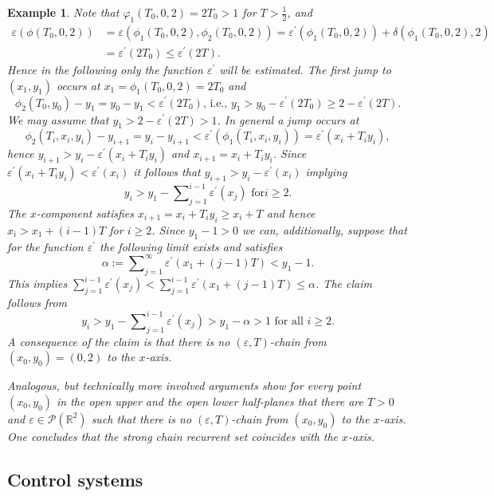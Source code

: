 \documentclass[preprint,12pt]{elsarticle}
\newtheorem{example}{Example}
\begin{document}
\begin{example}
Note that $\varphi_{1}(T_{0},0,2)=2T_{0}>1$ for $T>\frac{1}{2}$, and%
\begin{align*}
\varepsilon(\phi(T_{0},0,2))  &  =\varepsilon(\phi_{1}(T_{0},0,2),\phi
_{2}(T_{0},0,2))=\varepsilon^{\prime}(\phi_{1}(T_{0},0,2))+\delta(\phi
_{1}(T_{0},0,2),2)\\
&  =\varepsilon^{\prime}(2T_{0})\leq\varepsilon^{\prime}(2T).
\end{align*}
Hence in the following only the function $\varepsilon^{\prime}$ will be
estimated. The first jump to $(x_{1},y_{1})$ occurs at $x_{1}=\phi_{1}%
(T_{0},0,2)=2T_{0}$ and%
\[
\phi_{2}(T_{0},y_{0})-y_{1}=y_{0}-y_{1}<\varepsilon^{\prime}(2T_{0})\text{,
i.e., }y_{1}>y_{0}-\varepsilon^{\prime}(2T_{0})\geq2-\varepsilon^{\prime
}(2T).
\]
We may assume that $y_{1}>2-\varepsilon^{\prime}(2T)>1$. In general a jump
occurs at%
\[
\phi_{2}(T_{i},x_{i},y_{i})-y_{i+1}=y_{i}-y_{i+1}<\varepsilon^{\prime}%
(\phi_{1}(T_{i},x_{i},y_{i}))=\varepsilon^{\prime}(x_{i}+T_{i}y_{i}),
\]
hence $y_{i+1}>y_{i}-\varepsilon^{\prime}(x_{i}+T_{i}y_{i})$ and
$x_{i+1}=x_{i}+T_{i}y_{i}$. Since $\varepsilon^{\prime}(x_{i}+T_{i}%
y_{i})<\varepsilon^{\prime}(x_{i})$ it follows that $y_{i+1}>y_{i}%
-\varepsilon^{\prime}(x_{i})$ implying%
\[
y_{i}>y_{1}-\sum\nolimits_{j=1}^{i-1}\varepsilon^{\prime}(x_{j})\text{ for
}i\geq2.
\]
The $x$-component satisfies $x_{i+1}=x_{i}+T_{i}y_{i}\geq x_{i}+T$ and hence
$x_{i}>x_{1}+(i-1)T$ for $i\geq2$. Since $y_{1}-1>0$ we can, additionally,
suppose that for the function $\varepsilon^{\prime}$ the following limit
exists and satisfies%
\[
\alpha:=\sum\nolimits_{j=1}^{\infty}\varepsilon^{\prime}(x_{1}+(j-1)T)<y_{1}%
-1.
\]
This implies $\sum_{j=1}^{i-1}\varepsilon^{\prime}(x_{j})<\sum_{j=1}%
^{i-1}\varepsilon^{\prime}(x_{1}+(j-1)T)\leq\alpha$. The claim follows from%
\[
y_{i}>y_{1}-\sum\nolimits_{j=1}^{i-1}\varepsilon^{\prime}(x_{j})>y_{1}%
-\alpha>1\text{ for all }i\geq2.
\]
A consequence of the claim is that there is no $(\varepsilon,T)$-chain from
$(x_{0},y_{0})=(0,2)$ to the $x$-axis.

Analogous, but technically more involved arguments show for every point
$(x_{0},y_{0})$ in the open upper and the open lower half-planes that there
are $T>0$ and $\varepsilon\in\mathcal{P}(\mathbb{R}^{2})$ such that there is
no $(\varepsilon,T)$-chain from $(x_{0},y_{0})$ to the $x$-axis. One concludes
that the strong chain recurrent set coincides with the $x$-axis.
\end{example}

\subsection{Control systems\label{Subsection2.2}}
\end{document}
